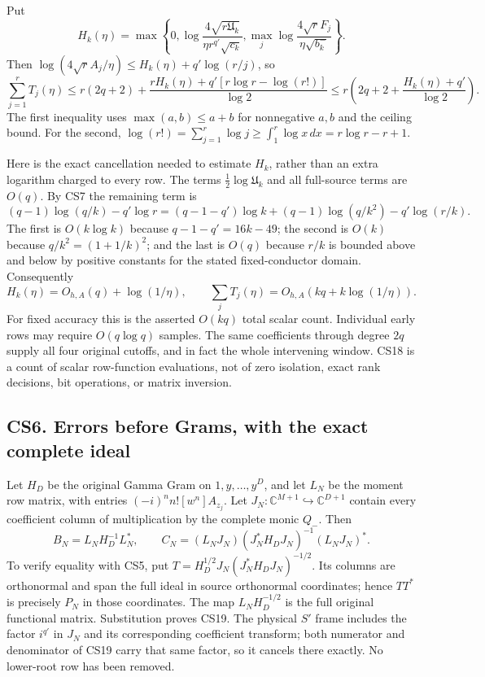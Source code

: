 \documentclass[11pt]{article}
\begin{document}
Put \[
 H_k(\eta)=\max\left\{0,\log\frac{4\sqrt{r\mathfrak U_k}}{\eta r^{q'}\sqrt{c_k}},
 \max_j\log\frac{4\sqrt rF_j}{\eta\sqrt{b_k^-}}\right\}.
\] Then \(\log(4\sqrt rA_j/\eta)\le H_k(\eta)+q'\log(r/j)\), so \[
 \boxed{\sum_{j=1}^rT_j(\eta)
 \le r(2q+2)+\frac{rH_k(\eta)+q'[r\log r-\log(r!)]}{\log2}
 \le r\left(2q+2+\frac{H_k(\eta)+q'}{\log2}\right).}
 \tag{CS17}
\] The first inequality uses \(\max(a,b)\le a+b\) for nonnegative \(a,b\) and the ceiling bound. For the second, \(\log(r!)=\sum_{j=1}^r\log j\ge\int_1^r\log x\,dx=r\log r-r+1\).

Here is the exact cancellation needed to estimate \(H_k\), rather than an extra logarithm charged to every row. The terms \(\tfrac12\log\mathfrak U_k\) and all full-source terms are \(O(q)\). By CS7 the remaining term is \[
 (q-1)\log(q/k)-q'\log r
 =(q-1-q')\log k+(q-1)\log(q/k^2)-q'\log(r/k).
\] The first is \(O(k\log k)\) because \(q-1-q'=16k-49\); the second is \(O(k)\) because \(q/k^2=(1+1/k)^2\); and the last is \(O(q)\) because \(r/k\) is bounded above and below by positive constants for the stated fixed-conductor domain. Consequently \[
 H_k(\eta)=O_{h,A}(q)+\log(1/\eta),\qquad
 \boxed{\sum_jT_j(\eta)=O_{h,A}(kq+k\log(1/\eta)).}
 \tag{CS18}
\] For fixed accuracy this is the asserted \(O(kq)\) total scalar count. Individual early rows may require \(O(q\log q)\) samples. The same coefficients through degree \(2q\) supply all four original cutoffs, and in fact the whole intervening window. CS18 is a count of scalar row-function evaluations, not of zero isolation, exact rank decisions, bit operations, or matrix inversion.

\subsection{CS6. Errors before Grams, with the exact complete ideal}\label{cs6.-errors-before-grams-with-the-exact-complete-ideal}

Let \(H_D\) be the original Gamma Gram on \(1,y,\ldots,y^D\), and let \(L_N\) be the moment row matrix, with entries \((-i)^nn![w^n]A_{z_j}\). Let \(J_N:\mathbb C^{M+1}\hookrightarrow\mathbb C^{D+1}\) contain every coefficient column of multiplication by the complete monic \(Q_-\). Then \[
 B_N=L_NH_D^{-1}L_N^*,\qquad
 C_N=(L_NJ_N)(J_N^*H_DJ_N)^{-1}(L_NJ_N)^*.
 \tag{CS19}
\] To verify equality with CS5, put \(T=H_D^{1/2}J_N(J_N^*H_DJ_N)^{-1/2}\). Its columns are orthonormal and span the full ideal in source orthonormal coordinates; hence \(TT^*\) is precisely \(P_N\) in those coordinates. The map \(L_NH_D^{-1/2}\) is the full original functional matrix. Substitution proves CS19. The physical \(S'\) frame includes the factor \(i^{q'}\) in \(J_N\) and its corresponding coefficient transform; both numerator and denominator of CS19 carry that same factor, so it cancels there exactly. No lower-root row has been removed.
\end{document}
